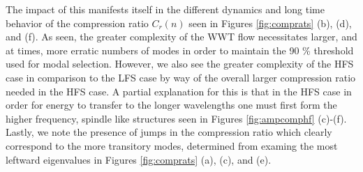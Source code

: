 \documentclass[a4paper,11pt]{article}
\begin{document}
The impact of this manifests itself in the different dynamics and long time behavior of the compression ratio $C_{r}(n)$ seen in Figures \ref{fig:comprats} (b), (d), and (f).  As seen, the greater complexity of the WWT flow necessitates larger, and at times, more erratic numbers of modes in order to maintain the 90 \% threshold used for modal selection.  However, we also see the greater complexity of the HFS case in comparison to the LFS case by way of the overall larger compression ratio needed in the HFS case.  A partial explanation for this is that in the HFS case in order for energy to transfer to the longer wavelengths one must first form the higher frequency, spindle like structures seen in Figures \ref{fig:ampcomphf} (c)-(f).  Lastly, we note the presence of jumps in the compression ratio which clearly correspond to the more transitory modes, determined from examing the most leftward eigenvalues in Figures \ref{fig:comprats} (a), (c), and (e).
\end{document}
